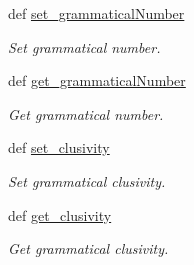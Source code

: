 \begin{DoxyCompactItemize}
def \hyperlink{classlmf_1_1src_1_1morphology_1_1word__form_1_1_word_form_afba8a8bff098989e06c9fce30e4c8163}{set\+\_\+grammatical\+Number}
\begin{DoxyCompactList}\small\item\em Set grammatical number. \end{DoxyCompactList}\item 
def \hyperlink{classlmf_1_1src_1_1morphology_1_1word__form_1_1_word_form_ae1d604cd7edc889a347d9ce41df150c6}{get\+\_\+grammatical\+Number}
\begin{DoxyCompactList}\small\item\em Get grammatical number. \end{DoxyCompactList}\item 
def \hyperlink{classlmf_1_1src_1_1morphology_1_1word__form_1_1_word_form_a711b4b9fb46e15d8d64c831dd3c73f15}{set\+\_\+clusivity}
\begin{DoxyCompactList}\small\item\em Set grammatical clusivity. \end{DoxyCompactList}\item 
def \hyperlink{classlmf_1_1src_1_1morphology_1_1word__form_1_1_word_form_af7009607358c6be4f37b7708193eb2e7}{get\+\_\+clusivity}
\begin{DoxyCompactList}\small\item\em Get grammatical clusivity. \end{DoxyCompactList}\end{DoxyCompactItemize}
